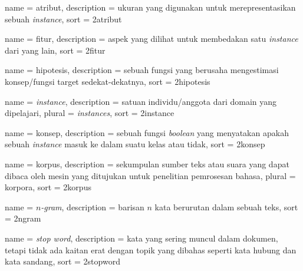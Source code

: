  {
	name        = atribut,
	description = {ukuran yang digunakan untuk merepresentasikan sebuah \textit{instance}},
	sort        = 2atribut
}

 {
	name        = fitur,
	description = {aspek yang dilihat untuk membedakan satu \textit{instance} dari yang lain},
	sort        = 2fitur
}

 {
	name        = hipotesis,
	description = {sebuah fungsi yang berusaha mengestimasi konsep/fungsi target sedekat-dekatnya},
	sort        = 2hipotesis
}

 {
	name        = \textit{instance},
	description = {satuan individu/anggota dari domain yang dipelajari},
	plural      = \textit{instances},
	sort        = 2instance
}

 {
	name        = konsep,
	description = {sebuah fungsi \textit{boolean} yang menyatakan apakah sebuah \textit{instance} masuk ke dalam suatu kelas atau tidak},
	sort        = 2konsep
}

 {
	name        = korpus,
	description = {sekumpulan sumber teks atau suara yang dapat dibaca oleh mesin yang ditujukan untuk penelitian pemrosesan bahasa},
	plural      = korpora,
	sort        = 2korpus
}

 {
	name        = \textit{$n$-gram},
	description = {barisan $n$ kata berurutan dalam sebuah teks},
	sort        = 2ngram
}

 {
	name        = \textit{stop word},
	description = {kata yang sering muncul dalam dokumen, tetapi tidak ada kaitan erat dengan topik yang dibahas seperti kata hubung dan kata sandang},
	sort        = 2stopword
}
